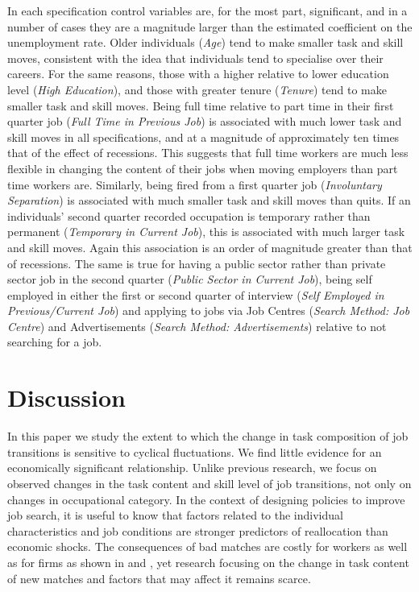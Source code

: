 \documentclass[11pt, oneside]{article}
\begin{document}
In each specification control variables are, for the most part, significant, and in a number of cases they are a magnitude larger than the estimated coefficient on the unemployment rate. Older individuals (\textit{Age}) tend to make smaller task and skill moves, consistent with the idea that individuals tend to specialise over their careers. For the same reasons, those with a higher relative to lower education level (\textit{High Education}), and those with greater tenure  (\textit{Tenure}) tend to make smaller task and skill moves. Being full time relative to part time in their first quarter job (\textit{Full Time in Previous Job}) is associated with much lower task and skill moves in all specifications, and at a magnitude of approximately ten times that of the effect of recessions. This suggests that full time workers are much less flexible in changing the content of their jobs when moving employers than part time workers are. Similarly, being fired from a first quarter job (\textit{Involuntary Separation}) is associated with much smaller task and skill moves than quits.
If an individuals' second quarter recorded occupation is temporary rather than permanent (\textit{Temporary in Current Job}), this is associated with much larger task and skill moves. Again this association is an order of magnitude greater than that of recessions. The same is true for having a public sector rather than private sector job in the second quarter (\textit{Public Sector in Current Job}), being self employed in either the first or second quarter of interview (\textit{Self Employed in Previous/Current Job}) and applying to jobs via Job Centres (\textit{Search Method: Job Centre}) and Advertisements (\textit{Search Method: Advertisements}) relative to not searching for a job.
	

	\section{Discussion}
	\label{sec:Conclusion}
	
	In this paper we study the extent to which the change in task composition of job transitions is sensitive to cyclical fluctuations. We find little evidence for an economically significant relationship. Unlike previous research, we focus on observed changes in the task content and skill level of job transitions, not only on changes in occupational category. In the context of designing policies to improve job search, it is useful to know that factors related to the individual characteristics and job conditions are stronger predictors of reallocation than economic shocks. The consequences of bad matches are costly for workers as well as for firms as shown in \cite{Fredriksson2018} and \cite{Guvenen2015}, yet research focusing on the change in task content of new matches and factors that may affect it remains scarce. 
	
\end{document}
